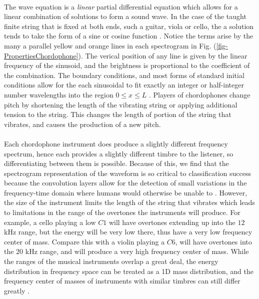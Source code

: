 \documentclass[12pt,letterpaper]{article}
\begin{document}
\paragraph*{}The wave equation is a \textit{linear} partial differential equation which allows for a linear combination of solutions to form a sound wave. In the case of the taught finite string that is fixed at both ends, such a guitar, viola or cello, the a solution tends to take the form of a sine or cosine function \cite{Hunter, Taylor, White}. Notice the terms arise by the many a parallel yellow and orange lines in each spectrogram in Fig. (\ref{fig-PropertiesChordophone}). The verical position of any line is given by the linear frequency of the sinusoid, and the brightness is proportional to the coefficient of the combination. The boundary conditions, and most forms of standard initial conditions allow for the each sinusoidal to fit exactly an integer or half-integer number wavelengths into the region $0 \leq x \leq L$ \cite{Haberman,Hunter}. Players of chordophones change pitch by shortening the length of the vibrating string or applying additional tension to the string. This changes the length of portion of the string that vibrates, and causes the production of a new pitch.

\paragraph*{}Each chordophone instrument does produce a slightly different frequency spectrum, hence each provides a slightly different timbre to the listener, so differentiating between them is possible. Because of this, we find that the spectrogram representation of the waveform is so critical to classification success because the convolution layers allow for the detection of small variations in the frequency-time domain where humans would otherwise be unable to \cite{Loy,Virtanen}. However, the size of the instrument limits the length of the string that vibrates which leads to limitations in the range of the overtones the instruments will produce. For example, a cello playing a low $C1$ will have overtones extending up into the $12$ kHz range, but the energy will be very low there, thus have a very low frequency center of mass. Compare this with a violin playing a $C6$, will have overtones into the $20$ kHz range, and will produce a very high frequency center of mass. While the ranges of the musical instruments overlap a great deal, the energy distribution in frequency space can be treated as a 1D mass distribution, and the frequency center of masses of instruments with similar timbres can still differ greatly \cite{Serizel}.
\end{document}

